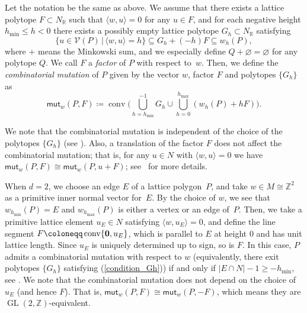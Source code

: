 \documentclass[pdftex]{sigma}%
\numberwithin{equation}{section}
\numberwithin{figure}{section}
\numberwithin{table}{section}
\newcommand{\ZZ}{\mathbb{Z}}
\newcommand{\RR}{\mathbb{R}}
\newcommand{\calV}{\mathcal{V}}
\newcommand{\GL}{\operatorname{GL}}
\newcommand{\mutation}{\mathsf{mut}}
\begin{document}
\begin{Definition}\label{def_mutation_polygon}
Let the notation be the same as above.
We assume that there exists a lattice polytope $F\subset N_\RR$ such that $\langle w,u\rangle=0$ for any $u\in F$, and
for each negative height $h_{\min}\le h<0$ there exists a possibly empty lattice polytope $G_h\subset N_\RR$ satisfying
\begin{equation}\label{condition_Gh}
\{u\in\calV(P)\,|\, \langle w,u \rangle=h\}\subseteq G_h+(-h)F\subseteq w_h(P),
\end{equation}
where $+$ means the Minkowski sum, and we especially define $Q+\varnothing=\varnothing$ for any polytope $Q$.
We call $F$ a \emph{factor} of $P$ with respect to~$w$.
Then, we define the \emph{combinatorial mutation} of $P$ given by the vector $w$, factor $F$ and polytopes $\{G_h\}$ as
\begin{displaymath}
\mutation_w(P,F)\coloneqq\operatorname{conv}\bigg(\bigcup_{h=h_{\min}}^{-1}G_h\cup\bigcup_{h=0}^{h_{\max}}(w_h(P)+hF)\bigg).
\end{displaymath}
\end{Definition}

We note that the combinatorial mutation is independent of the choice of the polytopes $\{G_h\}$ (see \cite[Proposition~1]{ACGK}).
Also, a translation of the factor $F$ does not affect the combinatorial mutation; that is,
for any $u\in N$ with $\langle w,u\rangle=0$ we have $\mutation_w(P,F)\cong\mutation_w(P,u+F)$; see~\cite{ACGK} for more details.

\begin{Remark}[the combinatorial mutation for the case of $d=2$]\label{rem_def_mutation}
When $d=2$, we choose an edge $E$ of a lattice polygon~$P$, and take $w\in M\cong\ZZ^2$ as a primitive inner normal vector for~$E$.
By the choice of $w$, we see that $w_{h_{\min}}(P)=E$ and $w_{h_{\max}}(P)$ is either a vertex or an edge of~$P$.
Then, we take a primitive lattice element $u_E\in N$ satisfying $\langle w,u_E \rangle=0$, and define the line segment $F\coloneqq\operatorname{conv}\{{\bf 0},u_E\}$,
which is parallel to $E$ at height $0$ and has unit lattice length. Since $u_E$ is uniquely determined up to sign, so is $F$.
In this case, $P$ admits a combinatorial mutation with respect to $w$ (equivalently, there exit polytopes $\{G_h\}$ satisfying (\ref{condition_Gh})) if and only if $|E\cap N|-1\ge -h_{\min}$, see \cite[Lemma~1]{KNP}.
We note that the combinatorial mutation does not depend on the choice of $u_E$ (and hence $F$). That is,
$\mutation_w(P,F)\cong\mutation_w(P,-F)$, which means they are $\GL(2,\ZZ)$-equivalent.
\end{Remark}
\end{document}
